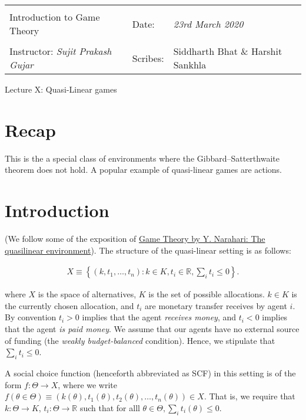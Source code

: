\documentclass[10pt,a4paper]{article}
\newcommand{\R}{\ensuremath{\mathbb R}}
\begin{document}
\begin{table}[!h]
\centering
\begin{tabularx}{\textwidth}{|Xll|}
\hline
& &\\
Introduction to Game Theory &  Date: & \emph{23rd March 2020}\\
 & &\\
Instructor: \emph{Sujit Prakash Gujar} & Scribes: & {Siddharth Bhat \& Harshit Sankhla} \\ 
 \hline

\end{tabularx}
\end{table}

\begin{center}
\begin{LARGE}
Lecture X: Quasi-Linear games
\end{LARGE}
\end{center}

\section{Recap}
This is the a special class of environments where the Gibbard–Satterthwaite
theorem does not hold.  A popular example of quasi-linear games are actions.

\section{Introduction}
(We follow some of the exposition of
\href{http://lcm.csa.iisc.ernet.in/gametheory/ln/web-md6-quasilinear.pdf}{Game Theory by Y. Narahari: The quasilinear environment}).
The structure of the quasi-linear setting is as follows:

\begin{align*}
X \equiv \left\{ (k, t_1, \dots, t_n) : k \in K, t_i \in \R, \sum_i t_i \leq 0 \right\}.
\end{align*}


where $X$ is the space of alternatives, $K$ is the set of possible allocations.
$k \in K$ is the currently chosen allocation, and $t_i$ are monetary transfer receives by agent $i$.
By convention $t_i > 0$ implies that the agent \emph{receives money}, and
$t_i < 0$ implies that the agent \emph{is paid money}. We assume that our
agents have no external source of funding (the \emph{weakly budget-balanced}
condition). Hence, we stipulate that $\sum_i t_i \leq 0$.

A social choice function (henceforth abbreviated as SCF) in this setting
is of the form $f: \Theta \rightarrow X$, where we write 
$f(\theta \in \Theta) \equiv (k(\theta), t_1(\theta), t_2(\theta), \dots, t_n(\theta)) \in X$.
That is, we require that $k: \Theta \rightarrow K$, $t_i: \Theta \rightarrow \R$
such that for alll $\theta \in \Theta, \sum_i t_i(\theta) \leq 0$.
\end{document}
